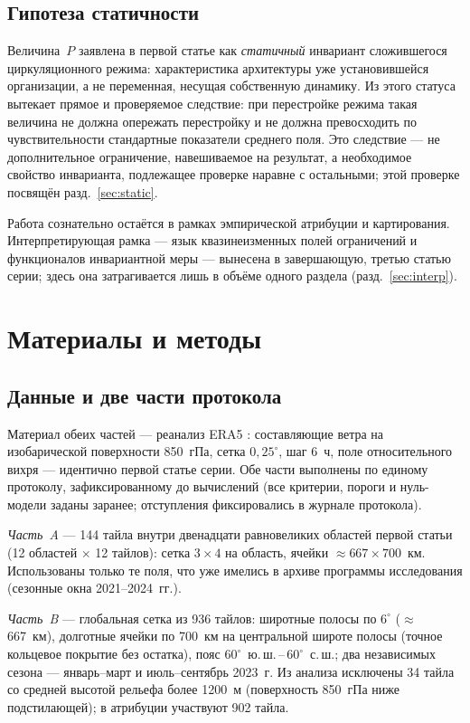 \documentclass[11pt,a4paper]{article}
\begin{document}
\subsection{Гипотеза статичности}

Величина~$P$ заявлена в первой статье как \emph{статичный} инвариант сложившегося циркуляционного режима: характеристика архитектуры уже установившейся организации, а не переменная, несущая собственную динамику. Из этого статуса вытекает прямое и проверяемое следствие: при перестройке режима такая величина не должна опережать перестройку и не должна превосходить по чувствительности стандартные показатели среднего поля. Это следствие --- не дополнительное ограничение, навешиваемое на результат, а необходимое свойство инварианта, подлежащее проверке наравне с остальными; этой проверке посвящён разд.~\ref{sec:static}.

Работа сознательно остаётся в рамках эмпирической атрибуции и картирования. Интерпретирующая рамка --- язык квазинеизменных полей ограничений и функционалов инвариантной меры --- вынесена в завершающую, третью статью серии; здесь она затрагивается лишь в объёме одного раздела (разд.~\ref{sec:interp}).

\section{Материалы и методы}
\label{sec:data}

\subsection{Данные и две части протокола}

Материал обеих частей --- реанализ ERA5 \cite{Hersbach2020,Soci2024}: составляющие ветра на изобарической поверхности 850~гПа, сетка $0{,}25^\circ$, шаг 6~ч, поле относительного вихря --- идентично первой статье серии. Обе части выполнены по единому протоколу, зафиксированному до вычислений (все критерии, пороги и нуль-модели заданы заранее; отступления фиксировались в журнале протокола).

\emph{Часть~A} --- 144 тайла внутри двенадцати равновеликих областей первой статьи (12 областей $\times$ 12 тайлов): сетка $3\times4$ на область, ячейки $\approx667\times700$~км. Использованы только те поля, что уже имелись в архиве программы исследования (сезонные окна 2021--2024~гг.).

\emph{Часть~B} --- глобальная сетка из 936 тайлов: широтные полосы по $6^\circ$ ($\approx$667~км), долготные ячейки по 700~км на центральной широте полосы (точное кольцевое покрытие без остатка), пояс $60^\circ$~ю.\,ш.\,--\,$60^\circ$~с.\,ш.; два независимых сезона --- январь--март и июль--сентябрь 2023~г. Из анализа исключены 34 тайла со средней высотой рельефа более 1200~м (поверхность 850~гПа ниже подстилающей); в атрибуции участвуют 902 тайла.
\end{document}
